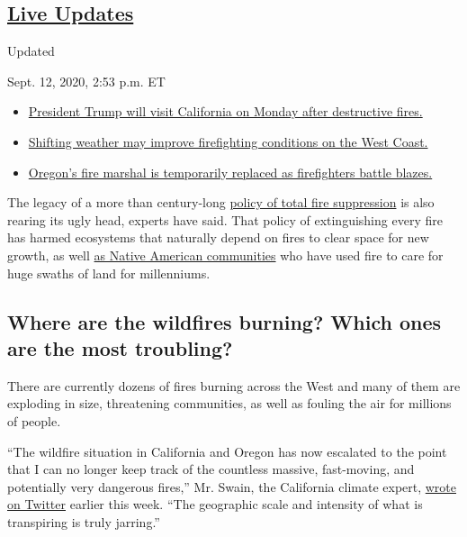 \hypertarget{live-updates}{%
\subsection{\texorpdfstring{\href{https://www.nytimes3xbfgragh.onion/2020/09/12/us/wildfires-live-updates.html}{Live
Updates}}{Live Updates}}\label{live-updates}}

Updated~

Sept. 12, 2020, 2:53 p.m. ET

\begin{itemize}
\tightlist
\item
  \href{https://www.nytimes3xbfgragh.onion/2020/09/12/us/wildfires-live-updates.html\#link-f3961ff}{President
  Trump will visit California on Monday after destructive fires.}
\item
  \href{https://www.nytimes3xbfgragh.onion/2020/09/12/us/wildfires-live-updates.html\#link-7e503ae9}{Shifting
  weather may improve firefighting conditions on the West Coast.}
\item
  \href{https://www.nytimes3xbfgragh.onion/2020/09/12/us/wildfires-live-updates.html\#link-5e4c548d}{Oregon's
  fire marshal is temporarily replaced as firefighters battle blazes.}
\end{itemize}

The legacy of a more than century-long
\href{https://www.nytimes3xbfgragh.onion/2020/09/10/climate/wildfires-climate-policy.html}{policy
of total fire suppression} is also rearing its ugly head, experts have
said. That policy of extinguishing every fire has harmed ecosystems that
naturally depend on fires to clear space for new growth, as well
\href{https://www.nytimes3xbfgragh.onion/2019/08/14/us/klamath-native-american-food.html}{as
Native American communities} who have used fire to care for huge swaths
of land for millenniums.

\hypertarget{where-are-the-wildfires-burning-which-ones-are-the-most-troubling}{%
\subsection{Where are the wildfires burning? Which ones are the most
troubling?}\label{where-are-the-wildfires-burning-which-ones-are-the-most-troubling}}

There are currently dozens of fires burning across the West and many of
them are exploding in size, threatening communities, as well as fouling
the air for millions of people.

``The wildfire situation in California and Oregon has now escalated to
the point that I can no longer keep track of the countless massive,
fast-moving, and potentially very dangerous fires,'' Mr. Swain, the
California climate expert,
\href{https://twitter.com/Weather_West/status/1303458376085508096}{wrote
on Twitter} earlier this week. ``The geographic scale and intensity of
what is transpiring is truly jarring.''

